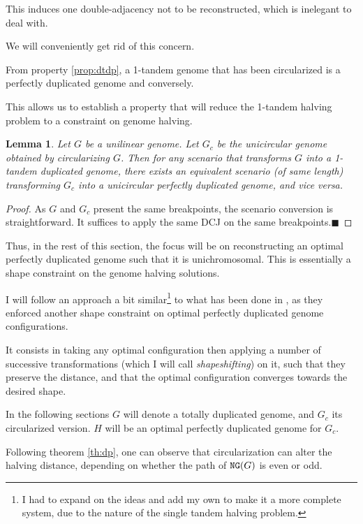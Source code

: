 \documentclass[11pt,final,twoside,nofrench]{thlifl}
\newcommand{\qed}{\ensuremath{\blacksquare}}
\renewcommand{\NG}{\ensuremath{\mbox{\texttt{NG}}}}
\newtheorem{proof}{Proof}
\newtheorem{lemma}{Lemma}
\begin{document}
This induces one double-adjacency not to be reconstructed, which is
inelegant to deal with.

We will conveniently get rid of this concern.

From property \ref{prop:dtdp}, a 1-tandem genome that has been
circularized is a perfectly duplicated genome and conversely.

This allows us to establish a property that will reduce the 1-tandem
halving problem to a constraint on genome halving.

\begin{lemma}
\label{lem:unicirc=tandem}
Let $G$ be a unilinear genome. Let $G_c$ be the unicircular genome obtained by circularizing $G$.
Then for any scenario that transforms $G$ into a 1-tandem duplicated genome, there exists an equivalent scenario (of same length) transforming $G_c$ into a unicircular perfectly duplicated genome, and vice versa.
\end{lemma}

\begin{proof}
As $G$ and $G_c$ present the same breakpoints, the scenario conversion is straightforward. It suffices to apply the same DCJ on the same breakpoints.\qed
\end{proof}

Thus, in the rest of this section, the focus will be on reconstructing
an optimal perfectly duplicated genome such that it is unichromosomal.
This is essentially a shape constraint on the genome halving
solutions.

I will follow an approach a bit similar\footnote{I had to
  expand on the ideas and add my own to make it a more complete system, due to the nature of the single tandem halving
  problem.} to what has been done in \cite{Kovac}, as
they enforced another shape constraint on optimal perfectly duplicated
genome configurations.

It consists in taking any optimal configuration then applying a number of
successive transformations (which I will call 
\emph{shapeshifting}) on it, such that they
preserve the distance, and that the optimal configuration converges
towards the desired shape.

In the following sections $G$ will denote a totally duplicated
genome, and $G_c$ its circularized version. $H$ will be an optimal perfectly
duplicated genome for $G_c$.

Following theorem \ref{th:dp}, one can observe that circularization can alter the halving distance, depending on whether the path of $\NG(G)$ is even or odd.
\end{document}
